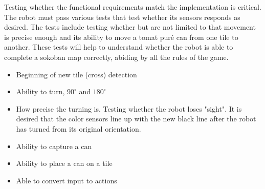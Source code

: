 \documentclass[../../main.tex]{subfiles}
\begin{document}
Testing whether the functional requirements match the implementation is critical.
The robot must pass various tests that test whether its sensors responds as desired. The tests include testing whether but are not limited to that movement is precise enough and its ability to move a tomat puré can from one tile to another. These tests will help to understand whether the robot is able to complete a sokoban map correctly, abiding by all the rules of the game.

\begin{itemize}
	\item Beginning of new tile (cross) detection
	
	\item Ability to turn, $90^{\circ}$ and $180^{\circ}$
	
	\item How precise the turning is. Testing whether the robot loses "sight". It is desired that the color sensors line up with the new black line after the robot has turned from its original orientation.
	
	\item Ability to capture a can
	
	\item Ability to place a can on a tile
	
	\item Able to convert input to actions
	
	
\end{itemize}


	
\end{document}
